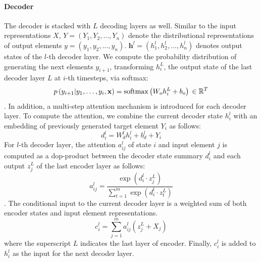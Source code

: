 \paragraph{Decoder}
The decoder is stacked with $L$ decoding layers as well.
Similar to the input representations $X$, 
$Y=(Y_1, Y_2, ..., Y_n)$ denote 
the distributional representations of output elements $y=(y_1, y_2, ..., y_n)$.
$\textbf{h}^l = (h^l_1, h^l_2, ..., h^l_n)$ denotes output states of the $l$-th decoder layer.
We compute the probability
distribution of generating the next elements $y_{i+1}$,
transforming $h_{i}^{L}$, the output state of the last decoder layer $L$ at $i$-th timesteps, via softmax:
\begin{equation}
p \left( y _ { i + 1 } | y _ { 1 } , \ldots , y _ { i } , \mathbf { x } \right) = 
\operatorname { softmax } \left( W _ { o } h _ { i } ^ { L } + b _ { o } \right) \\ 
\in \mathbb { R } ^ { T }
\end{equation}
.
In addition, a multi-step attention mechanism is introduced for each decoder layer.
To compute the attention, we combine the current decoder state
$h^l_{i}$ with an embedding of previously generated target element $Y_{i}$
as follows:
\begin{equation}
d _ { i } ^ { l } = W _ { d } ^ { l } h _ { i } ^ { l } + b _ { d } ^ { l } + Y _ { i }
\end{equation}
For $l$-th decoder layer, the attention $a^l_{ij}$ of state $i$ and input element $j$
is computed as a dop-product between the decoder state summary 
$d^l_i$ and each output $z^L_j$ of the last encoder layer as follows:
\begin{equation}\label{eq:a}
a _ { i j } ^ { l } = \frac { \exp \left( d _ { i } ^ { l } \cdot z _ { j } ^ { L } \right) } { \sum _ { t = 1 } ^ { m } \exp \left( d _ { i } ^ { l } \cdot z _ { t } ^ { L } \right) }
\end{equation}
.
The conditional input to the current 
decoder layer is a weighted sum of both encoder states and input element representations.
\begin{equation}\label{eq:c}
c _ { i } ^ { l } = \sum _ { j = 1 } ^ { m } a _ { i j } ^ { l } \left( z _ { j } ^ { L } + X_j \right)
\end{equation}
where the superscript $L$ indicates the last layer of encoder.  
Finally, $c _ { i } ^ { l }$ is added to $h_{i}^{l}$ as the input for the next decoder layer.


